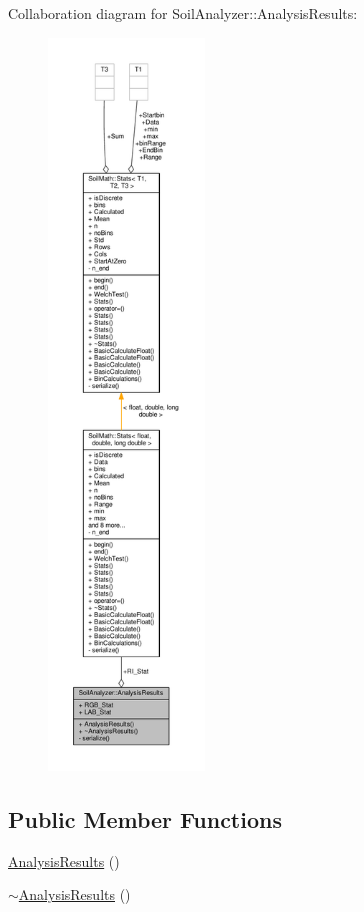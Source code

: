 Collaboration diagram for Soil\+Analyzer\+:\+:Analysis\+Results\+:\nopagebreak
\begin{figure}[H]
\begin{center}
\leavevmode
\includegraphics[height=550pt]{class_soil_analyzer_1_1_analysis_results__coll__graph}
\end{center}
\end{figure}
\subsection*{Public Member Functions}
\begin{DoxyCompactItemize}
\item 
\hyperlink{class_soil_analyzer_1_1_analysis_results_a893864c1e4bf50bf6979088a390da482}{Analysis\+Results} ()
\item 
\hyperlink{class_soil_analyzer_1_1_analysis_results_aacbbf98653346b6176867a352c83587e}{$\sim$\+Analysis\+Results} ()
\end{DoxyCompactItemize}
